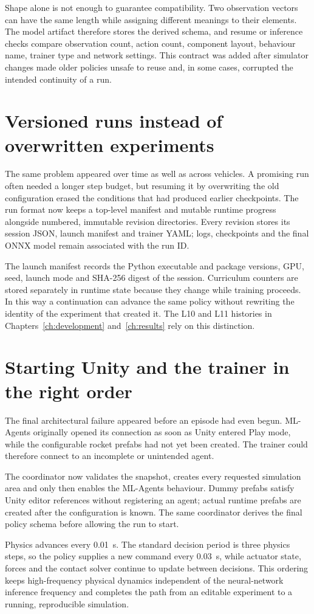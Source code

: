 Shape alone is not enough to guarantee compatibility. Two observation vectors can have the same
length while assigning different meanings to their elements. The model artifact therefore
stores the derived schema, and resume or inference checks compare observation count, action
count, component layout, behaviour name, trainer type and network settings. This contract was
added after simulator changes made older policies unsafe to reuse and, in some cases, corrupted
the intended continuity of a run.

\section{Versioned runs instead of overwritten experiments}

The same problem appeared over time as well as across vehicles. A promising run often needed a
longer step budget, but resuming it by overwriting the old configuration erased the conditions
that had produced earlier checkpoints. The run format now keeps a top-level manifest and mutable
runtime progress alongside numbered, immutable revision directories. Every revision stores its
session JSON, launch manifest and trainer YAML; logs, checkpoints and the final ONNX model remain
associated with the run ID.

The launch manifest records the Python executable and package versions, GPU, seed, launch mode
and SHA-256 digest of the session. Curriculum counters are stored separately in runtime state
because they change while training proceeds. In this way a continuation can advance the same
policy without rewriting the identity of the experiment that created it. The L10 and L11
histories in Chapters~\ref{ch:development} and~\ref{ch:results} rely on this distinction.

\section{Starting Unity and the trainer in the right order}

The final architectural failure appeared before an episode had even begun. ML-Agents originally
opened its connection as soon as Unity entered Play mode, while the configurable rocket prefabs
had not yet been created. The trainer could therefore connect to an incomplete or unintended
agent.

The coordinator now validates the snapshot, creates every requested simulation area and only
then enables the ML-Agents behaviour. Dummy prefabs satisfy Unity editor references without
registering an agent; actual runtime prefabs are created after the configuration is known. The
same coordinator derives the final policy schema before allowing the run to start.

Physics advances every \SI{0.01}{s}. The standard decision period is three physics steps, so the
policy supplies a new command every \SI{0.03}{s}, while actuator state, forces and the contact
solver continue to update between decisions. This ordering keeps high-frequency physical
dynamics independent of the neural-network inference frequency and completes the path from an
editable experiment to a running, reproducible simulation.
